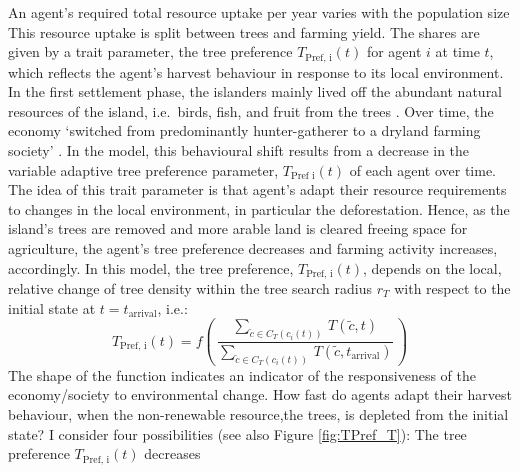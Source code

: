 An agent's required total resource uptake per year varies with the population size 
This resource uptake is split between trees and farming yield.
The shares are given by a trait parameter, the tree preference $T_\text{Pref, i}(t)$ for agent $i$ at time $t$, which reflects the agent's harvest behaviour in response to its local environment.
In the first settlement phase, the islanders mainly lived off the abundant natural resources of the island, i.e.\ birds, fish, and fruit from the trees \citet{Bahn2017}. 
Over time, the economy `switched from predominantly hunter-gatherer to a dryland farming society' \citep{Louwagie2006}.
In the model, this behavioural shift results from a decrease in the variable adaptive tree preference parameter, $T_\text{Pref i}(t)$ of each agent over time.
The idea of this trait parameter is that agent's adapt their resource requirements to changes in the local environment, in particular the deforestation. 
Hence, as the island's trees are removed and more arable land is cleared freeing space for agriculture, the agent's tree preference decreases and farming activity increases, accordingly.
In this model, the tree preference, $T_\text{Pref, i}(t)$, depends on the local, relative change of tree density within the tree search radius $r_T$ with respect to the initial state at $t=t_\text{arrival}$, i.e.:
\begin{equation}\label{eq:TPref}
T_\text{Pref, i}(t) = f\left( \, \frac{\sum_{\tilde{c} \in C_{T}(c_i(t)) } \, T(\tilde{c}, t)}{\sum_{\tilde{c} \in C_{T}(c_i(t))} \, T(\tilde{c}, t_\text{arrival}) } \, \right)
\end{equation}
The shape of the function indicates an indicator of the responsiveness of the economy/society to environmental change. How fast do agents adapt their harvest behaviour, when the non-renewable resource,the trees, is depleted from the initial state?  
I consider four possibilities (see also Figure \ref{fig:TPref_T}): The tree preference $T_\text{Pref, i}(t)$ decreases
